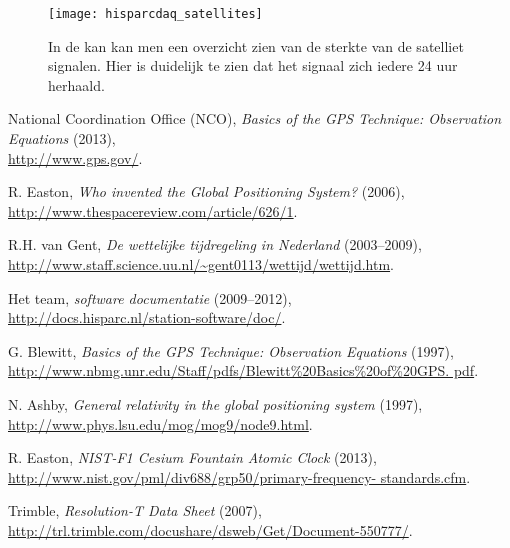 \begin{figure}
    \centering
    \texttt{[image: hisparcdaq\_satellites]}
    \caption{In de \hisparc \daq kan kan men een overzicht zien van de
    sterkte van de satelliet signalen. Hier is duidelijk te zien dat het
    signaal zich iedere 24 uur herhaald.}
    \label{fig:hisparcdaq_satellites}
\end{figure}

\begin{thebibliography}{9}
     National Coordination Office (NCO), \emph{Basics
    of the GPS Technique: Observation Equations} (2013),\\
    \url{http://www.gps.gov/}.

     R. Easton, \emph{Who invented the Global
    Positioning System?} (2006),\\
    \url{http://www.thespacereview.com/article/626/1}.

     R.H. van Gent, \emph{De wettelijke
    tijdregeling in Nederland} (2003--2009),\\
    \url{http://www.staff.science.uu.nl/~gent0113/wettijd/wettijd.htm}.

     Het \hisparc team, \emph{\hisparc
    software documentatie} (2009--2012),\\
    \url{http://docs.hisparc.nl/station-software/doc/}.

     G. Blewitt, \emph{Basics of the GPS
    Technique: Observation Equations} (1997),\\
    \url{http://www.nbmg.unr.edu/Staff/pdfs/Blewitt%
    pdf}.

     N. Ashby, \emph{General relativity in the
    global positioning system} (1997),\\
    \url{http://www.phys.lsu.edu/mog/mog9/node9.html}.

     R. Easton, \emph{NIST-F1 Cesium Fountain
    Atomic Clock} (2013),\\
    \url{http://www.nist.gov/pml/div688/grp50/primary-frequency-
    standards.cfm}.

     Trimble, \emph{Resolution-T Data Sheet}
    (2007),\\
    \url{http://trl.trimble.com/docushare/dsweb/Get/Document-550777/}.
\end{thebibliography}



